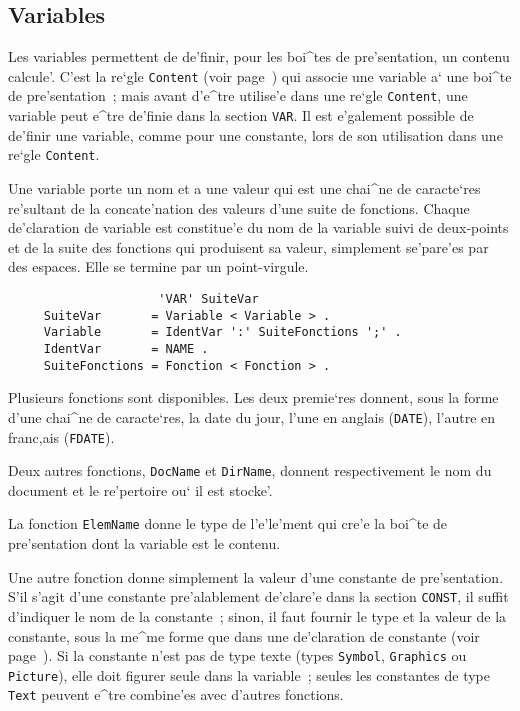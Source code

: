 {\subsection{Variables}
\label{variables}

Les variables permettent de de'finir, pour les boi^tes de pre'sentation, un
contenu calcule'. C'est la re`gle {\tt Content} (voir page~\pageref{content})
qui associe une variable a` une boi^te de pre'sentation~; mais avant d'e^tre
utilise'e dans une re`gle {\tt Content}, une variable peut e^tre de'finie
dans la section {\tt VAR}. Il est e'galement possible de de'finir une
variable, comme pour une constante, lors de son utilisation dans une re`gle
{\tt Content}.

Une variable porte un nom et a une valeur qui est une chai^ne de caracte`res
re'sultant de la concate'nation des valeurs d'une suite de fonctions.
Chaque de'claration de variable est constitue'e du nom de la variable suivi
de deux-points et de la suite des fonctions qui produisent sa valeur, simplement
se'pare'es par des espaces. Elle se termine par un point-virgule.

\begin{verbatim}
                     'VAR' SuiteVar
     SuiteVar       = Variable < Variable > .
     Variable       = IdentVar ':' SuiteFonctions ';' .
     IdentVar       = NAME .
     SuiteFonctions = Fonction < Fonction > .
\end{verbatim}

Plusieurs fonctions sont disponibles. Les deux premie`res donnent, sous la forme
d'une chai^ne de caracte`res, la date du jour, l'une en anglais ({\tt DATE}),
l'autre en franc,ais ({\tt FDATE}).

Deux autres fonctions, {\tt DocName} et {\tt DirName}, donnent respectivement
le nom du document et le re'pertoire ou` il est stocke'.

La fonction {\tt ElemName} donne le type de l'e'le'ment qui cre'e la boi^te
de pre'sentation dont la variable est le contenu.

Une autre fonction donne simplement la valeur d'une constante de
pre'sentation. S'il s'agit d'une constante pre'alablement de'clare'e dans la
section {\tt CONST}, il suffit d'indiquer le nom de la
constante~; sinon, il faut fournir le type et la valeur de la constante,
sous la me^me forme que dans une de'claration de constante (voir
page~\pageref{constpres}). Si la constante n'est pas de type texte (types
{\tt Symbol}, {\tt Graphics} ou {\tt Picture}), elle doit figurer seule
dans la variable~; seules les constantes de type {\tt Text} peuvent
e^tre combine'es avec d'autres fonctions.

}
